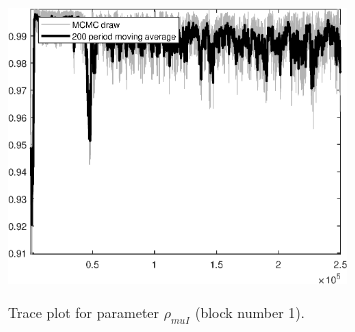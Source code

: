 \begin{figure}[H]
\centering
  \includegraphics[width=0.8\textwidth]{BRS_aggregate/graphs/TracePlot_rho_muI_blck_1}\\
    \caption{Trace plot for parameter ${\rho_{muI}}$ (block number 1).}
\end{figure}
